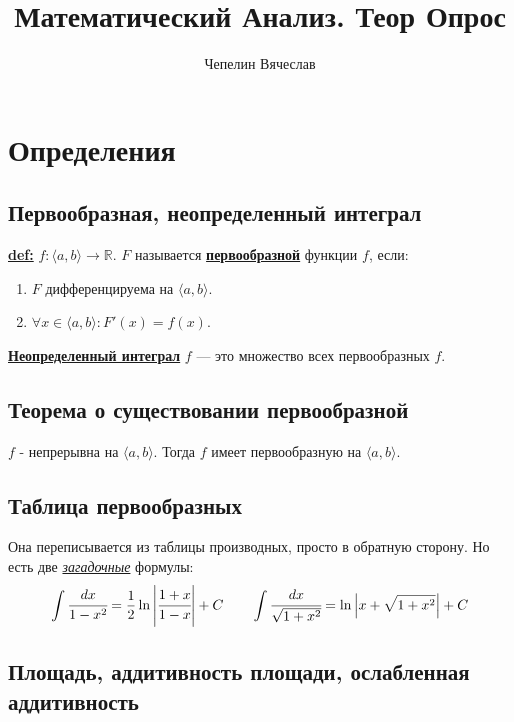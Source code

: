 \documentclass{article}
\title{Математический Анализ. Теор Опрос}
\author{Чепелин Вячеслав}
\date{}
\newcommand{\deff}[1]{\underline{\textbf{#1}}}
\begin{document}
\maketitle
\tableofcontents
\newpage

\section{Определения}

\subsection{Первообразная, неопределенный интеграл}

 \deff{def:} $f: \langle a,b\rangle \rightarrow \mathbb{R}$. $F$ называется \deff{первообразной} функции $f$, если:

\begin{enumerate}
    \item $F$ дифференцируема на $\langle a,b\rangle$.

    \item $\forall x \in \langle a,b\rangle: F'(x) = f(x) $.
\end{enumerate}

\deff{Неопределенный интеграл} $f$ --- это множество всех первообразных $f$.

\subsection{Теорема о существовании первообразной}

$f$ - непрерывна на $\langle a,b \rangle$. Тогда $f$ имеет первообразную на $\langle a,b\rangle$.

\subsection{Таблица первообразных}

Она переписывается из таблицы производных, просто в обратную сторону. Но есть две \uline{\emph{загадочные}} формулы:
     $$\displaystyle \int \cfrac{dx}{1-x^2} = \frac{1}{2}\ln \left|\cfrac{1+x}{1-x}\right| + C \quad \quad \int \cfrac{dx}{\sqrt{1+x^2}} = \ln \left|x + \sqrt{1+x^2}\right| + C$$

\subsection{Площадь, аддитивность площади, ослабленная аддитивность}
\end{document}
